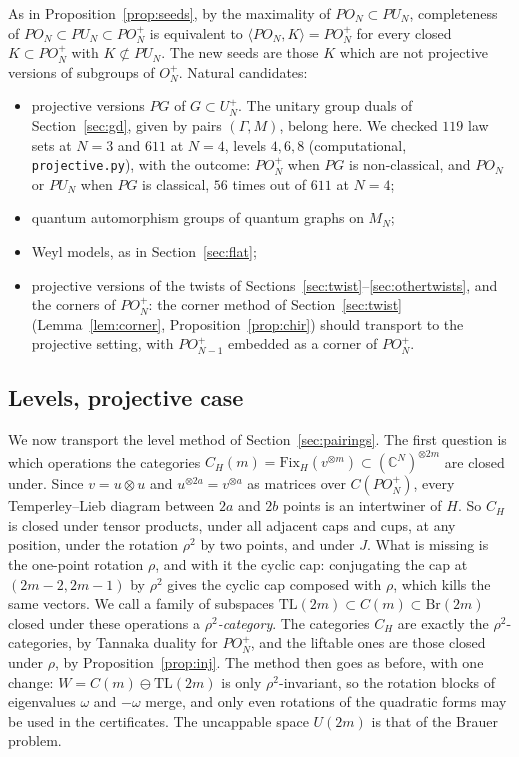 \documentclass[11pt]{amsart}
\theoremstyle{definition}
\theoremstyle{remark}
\theoremstyle{plain}
\numberwithin{equation}{section}
\numberwithin{table}{section}
\newcommand{\C}{\mathbb C}
\newcommand{\TL}{\mathrm{TL}}
\newcommand{\Fix}{\mathrm{Fix}}
\begin{document}
As in Proposition~\ref{prop:seeds}, by the maximality of $PO_N\subset PU_N$, completeness of
$PO_N\subset PU_N\subset PO_N^+$ is equivalent to $\langle PO_N,K\rangle=PO_N^+$ for every closed $K\subset PO_N^+$ with
$K\not\subset PU_N$. The new seeds are those $K$ which are not projective versions of subgroups of $O_N^+$. Natural
candidates:
\begin{itemize}
\item projective versions $PG$ of $G\subset U_N^+$. The unitary group duals of Section~\ref{sec:gd}, given by pairs $(\Gamma,M)$,
belong here. We checked $119$ law sets at $N=3$ and $611$ at $N=4$, levels $4,6,8$ (computational, \texttt{projective.py}), with the outcome:
$PO_N^+$ when $PG$ is non-classical, and $PO_N$ or $PU_N$ when $PG$ is classical, $56$ times out of $611$ at $N=4$;
\item quantum automorphism groups of quantum graphs on $M_N$;
\item Weyl models, as in Section~\ref{sec:flat};
\item projective versions of the twists of Sections~\ref{sec:twist}--\ref{sec:othertwists}, and the corners of $PO_N^+$: the corner method of Section~\ref{sec:twist} (Lemma~\ref{lem:corner}, Proposition~\ref{prop:chir}) should transport to the
projective setting, with $PO_{N-1}^+$ embedded as a corner of $PO_N^+$.
\end{itemize}

\subsection{Levels, projective case}\label{sec:projlevels}

We now transport the level method of Section~\ref{sec:pairings}. The first question is which operations the categories $C_H(m)=\Fix_H(v^{\otimes m})\subset(\C^N)^{\otimes 2m}$ are closed under. Since $v=u\otimes u$ and $u^{\otimes 2a}=v^{\otimes a}$ as matrices over $C(PO_N^+)$, every Temperley--Lieb diagram between $2a$ and $2b$ points is an intertwiner of $H$. So $C_H$ is closed under tensor products, under all adjacent caps and cups, at any position, under the rotation $\rho^2$ by two points, and under $J$. What is missing is the one-point rotation $\rho$, and with it the cyclic cap: conjugating the cap at $(2m-2,2m-1)$ by $\rho^2$ gives the cyclic cap composed with $\rho$, which kills the same vectors. We call a family of subspaces $\TL(2m)\subset C(m)\subset\mathrm{Br}(2m)$ closed under these operations a \emph{$\rho^2$-category}. The categories $C_H$ are exactly the $\rho^2$-categories, by Tannaka duality for $PO_N^+$, and the liftable ones are those closed under $\rho$, by Proposition~\ref{prop:inj}. The method then goes as before, with one change: $W=C(m)\ominus\TL(2m)$ is only $\rho^2$-invariant, so the rotation blocks of eigenvalues $\omega$ and $-\omega$ merge, and only even rotations of the quadratic forms may be used in the certificates. The uncappable space $U(2m)$ is that of the Brauer problem.
\end{document}
